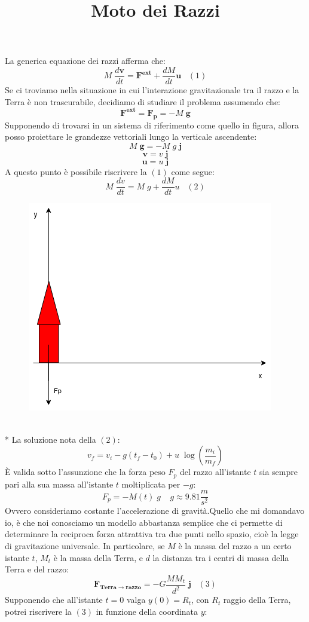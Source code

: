 \documentclass[10pt,a4paper]{book}
\title{Moto dei Razzi}
\date{}
\begin{document}
\noindent{}La generica equazione dei razzi afferma che:
$$
	M\;\frac{d\mathbf v}{dt} = \mathbf{F^{ext}} + \frac{dM}{dt} \mathbf u\;\;\;(1)
$$
Se ci troviamo nella situazione in cui l'interazione gravitazionale tra il razzo e la Terra è non trascurabile, decidiamo di studiare il problema assumendo che:
$$
\mathbf{F^{ext}} = \mathbf{F_p} = - M\;\mathbf g
$$
Supponendo di trovarsi in un sistema di riferimento come quello in figura, allora posso proiettare le grandezze vettoriali lungo la verticale ascendente:
$$
M\;\mathbf g = - M\;g\;\mathbf j
$$
$$
\mathbf v = v\;\mathbf j
$$
$$
\mathbf u = u\;\mathbf j
$$
A questo punto è possibile riscrivere la $(1)$ come segue:
$$
	M\;\frac{dv}{dt} = M\;g + \frac{dM}{dt} u\;\;\;(2)
$$
\begin{figure}[h]
	\centering
	\includegraphics[width=0.7\linewidth]{rocket.png}
	\label{fig:rocket}
\end{figure}\\*
La soluzione nota della $(2)$:
$$
v_f = v_i - g(t_f-t_0) + u\;\log\left(\frac{m_i}{m_f}\right)
$$
È valida sotto l'assunzione che la forza peso $F_p$ del razzo all'istante $t$ sia sempre pari alla sua massa all'istante $t$ moltiplicata per $-g$:
$$
F_p = -M(t)\;g\;\;\;\;g \approx 9.81 \frac{m}{s^2}
$$
Ovvero consideriamo costante l'accelerazione di gravità.\newpage\noindent{}Quello che mi domandavo io, è che noi conosciamo un modello abbastanza semplice che ci permette di determinare la reciproca forza attrattiva tra due punti nello spazio, cioè la legge di gravitazione universale. In particolare, se $M$ è la massa del razzo a un certo istante $t$, $M_t$ è la massa della Terra, e $d$ la distanza tra i centri di massa  della Terra e del razzo:
$$
\mathbf{F_{Terra\rightarrow razzo}} = -G \frac{MM_t}{d^2}\;\mathbf j\;\;\;(3)
$$
Supponendo che all'istante $t=0$ valga $y(0)=R_t$, con $R_t$ raggio della Terra, potrei riscrivere la $(3)$ in funzione della coordinata $y$:
\end{document}
